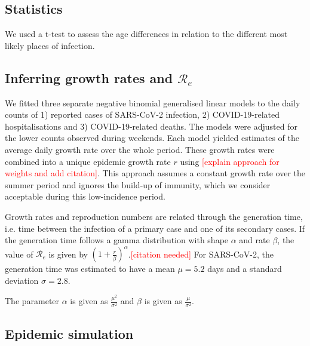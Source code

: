 \documentclass[10pt, a4paper, twoside]{article}
\begin{document}
\begin{multicols}{2}
\subsection{Statistics}
We used a t-test to assess the age differences in relation to the different most likely places of infection.

\subsection{Inferring growth rates and $\mathcal{R}_e$}

We fitted three separate negative binomial generalised linear models to the daily counts of 1) reported cases of SARS-CoV-2 infection, 2) COVID-19-related hospitalisations and 3) COVID-19-related deaths.
The models were adjusted for the lower counts observed during weekends.
Each model yielded estimates of the average daily growth rate over the whole period.
These growth rates were combined into a unique epidemic growth rate $r$ using \textcolor{red}{[explain approach for weights and add citation]}.
This approach assumes a constant growth rate over the summer period and ignores the build-up of immunity, which we consider acceptable during this low-incidence period.

Growth rates and reproduction numbers are related through the generation time, i.e. time between the infection of a primary case and one of its secondary cases.\cite{svensson_note_2007}
If the generation time follows a gamma distribution with shape $\alpha$ and rate $\beta$, the value of $\mathcal{R}_e$ is given by $(1 + \frac{r}{\beta} )^\alpha$.\textcolor{red}{[citation needed]}
For SARS-CoV-2, the generation time was estimated to have a mean $\mu= 5.2$ days and a standard deviation $\sigma = 2.8$.\cite{ganyani_estimating_2020}

The parameter $\alpha$ is given as $\frac{\mu^2}{\sigma^2 }$ and $\beta$ is given as $\frac{\mu}{\sigma^2}$. 

\subsection{Epidemic simulation}


\end{multicols}
\end{document}

